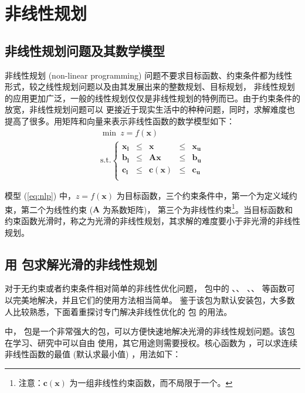  \section{非线性规划}
 \subsection{非线性规划问题及其数学模型}
非线性规划 (non-linear programming) 问题不要求目标函数、约束条件都为线性形式，较之线性规划问题以及由其发展出来的整数规划、目标规划，
非线性规划的应用更加广泛，一般的线性规划仅仅是非线性规划的特例而已。由于约束条件的放宽，非线性规划问题可以
更接近于现实生活中的种种问题，同时，求解难度也提高了很多。用矩阵和向量来表示非线性函数的数学模型如下：
 \begin{equation}\label{eq:nlp}
\begin{array}{l}
 \min \ z=f({\mathbf{x}})  \\
 \text{s.t.}\left\{ \begin{array}{ccccc}
   \mathbf{x_l}& \leqslant&    \mathbf{x}  & \leqslant  & \mathbf{x_u} \\
   \mathbf{b_l}& \leqslant&   \mathbf{Ax}  & \leqslant  & \mathbf{b_u} \\
   \mathbf{c_l}& \leqslant&  \mathbf{c(x)} & \leqslant  & \mathbf{c_u}\\
 \end{array} \right.
 \end{array}
\end{equation}

模型 (\ref{eq:nlp}) 中，$z=f(\mathbf{x})$ 为目标函数，三个约束条件中，第一个为定义域约束，第二个为线性约束 ($\mathbf{A}$ 为系数矩阵)，
第三个为非线性约束\footnote{注意：$\mathbf{c(x)}$ 为一组非线性约束函数，而不局限于一个。}。当目标函数和
约束函数光滑时，称之为光滑的非线性规划，其求解的难度要小于非光滑的非线性规划。
\subsection{用  包求解光滑的非线性规划}
对于无约束或者约束条件相对简单的非线性优化问题， 包中的 、、 
 、、 等函数可以完美地解决，并且它们的使用方法相当简单。
 鉴于该包为默认安装包，大多数人比较熟悉，下面着重探讨专门解决非线性优化的  包\citep{Rdonlp207}
 的用法。


\R 中， 包是一个非常强大的包，可以方便快速地解决光滑的非线性规划问题。该包在学习、研究中可以自由
使用，其它用途则需要授权。核心函数为 ，可以求连续非线性函数的最值 (默认求最小值) ，用法如下：

